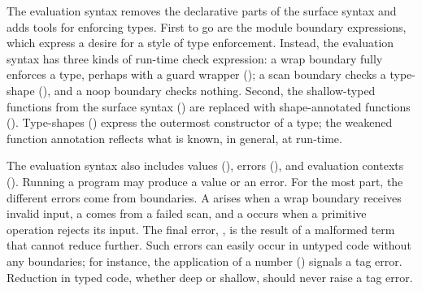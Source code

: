 \documentclass[ twoside,open=right,titlepage,numbers=noenddot,headinclude,%
                footinclude=true,cleardoublepage=empty,abstract=off,
                BCOR=5mm,paper=a4,fontsize=11pt,%
                ngerman,american,%
                parts,pdfspacing]{scrreprt}
\begin{document}
The evaluation syntax removes the declarative parts of the surface syntax
 and adds tools for enforcing types.
First to go are the module boundary expressions, which express a desire
 for a style of type enforcement.
Instead, the evaluation syntax has three kinds of run{-}time check expression:
 a wrap boundary fully enforces a type, perhaps with a guard wrapper (\relax{$\emon{\stype}{\svalue}$});
 a scan boundary checks a type{-}shape (\relax{$\sshape$}),
 and a noop boundary checks nothing.
Second, the shallow{-}typed functions from the surface syntax (\relax{$\efun{\tann{\svar}{\tfloor{\stype}}}{\ssurface}$})
 are replaced with shape{-}annotated functions (\relax{$\efun{\tann{\svar}{\sshape}}{\sexpr}$}).
Type{-}shapes (\relax{$\sshape$}) express the outermost constructor of a type;
 the weakened function annotation reflects what is known, in general,
 at run{-}time.

The evaluation syntax also includes values (\relax{$\svalue$}),
 errors (\relax{$\serror$}),
 and evaluation contexts (\relax{$\sctx$}).
Running a program may produce a value or an error.
For the most part, the different errors come from boundaries.
A \relax{$\swraperror$} arises when a wrap boundary receives invalid input,
 a \relax{$\sscanerror$} comes from a failed scan,
 and a \relax{$\sdivzeroerror$} occurs when a primitive operation rejects its input.
The final error, \relax{$\stagerror$}, is the result of a malformed term that cannot
 reduce further.
Such errors can easily occur in untyped code without any boundaries;
 for instance, the application of a number () signals a tag error.
Reduction in typed code, whether deep or shallow, should never raise a
 tag error.
\end{document}
